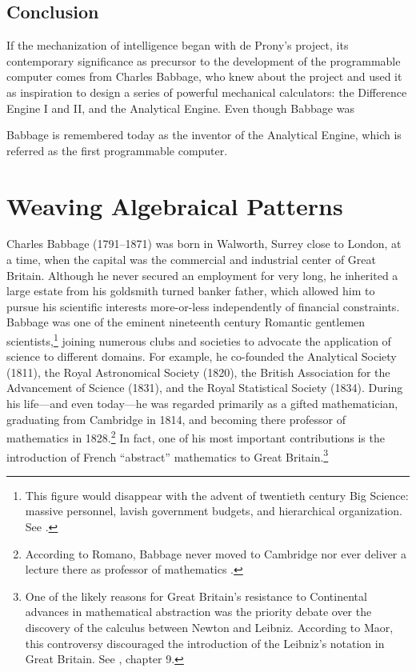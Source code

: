 \documentclass[version=last,draft=false,paper=A4,portrait,twoside=true,twocolumn=false,headinclude=false,footinclude=false,mpinclude=true,fontsize=12,BCOR=20mm,DIV=calc,pagesize=auto,open=right,chapterprefix=true,numbers=autoendperiod,headsepline=false,headings=twolinechapter,parskip=false]{scrbook}
\begin{document}
\subsection{Conclusion}
\label{sec:org02e9797}

If the mechanization of intelligence began with de Prony's project, its
contemporary significance as precursor to the development of the
programmable computer comes from Charles Babbage, who knew about the
project and used it as inspiration to design a series of powerful
mechanical calculators: the Difference Engine I and II, and the Analytical
Engine. Even though Babbage was 


Babbage is remembered today as the inventor of the Analytical Engine, which
is referred as the first programmable computer.

\section{Weaving Algebraical Patterns}
\label{sec:org3631bb6}

Charles Babbage (1791--1871) was born in Walworth, Surrey close to London,
at a time, when the capital was the commercial and industrial center of
Great Britain. Although he never secured an employment for very long, he
inherited a large estate from his goldsmith turned banker father, which
allowed him to pursue his scientific interests more-or-less independently
of financial constraints. Babbage was one of the eminent nineteenth century
Romantic gentlemen scientists,\footnote{This figure would disappear with the advent of twentieth century
Big Science: massive personnel, lavish government budgets, and hierarchical
organization. See \textcite{mirowski2011}.} joining numerous clubs and societies
to advocate the application of science to different domains. For example,
he co-founded the Analytical Society (1811), the Royal Astronomical Society
(1820), the British Association for the Advancement of Science (1831), and
the Royal Statistical Society (1834). During his life---and even today---he
was regarded primarily as a gifted mathematician, graduating from Cambridge
in 1814, and becoming there professor of mathematics in 1828.\footnote{According to Romano, Babbage never moved to Cambridge nor ever
deliver a lecture there as professor of mathematics
\autocite[p. 387]{romano1982}.} In
fact, one of his most important contributions is the introduction of French
``abstract'' mathematics to Great Britain.\footnote{One of the likely reasons for Great Britain's resistance to
Continental advances in mathematical abstraction was the priority debate
over the discovery of the calculus between Newton and Leibniz. According to
Maor, this controversy discouraged the introduction of the Leibniz's
notation in Great Britain. See \textcite{romano1982}, chapter 9.}
\end{document}
